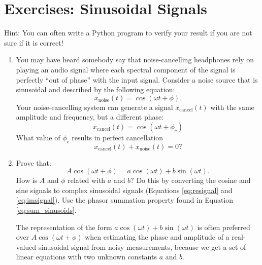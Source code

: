 \newpage
\section{Exercises: Sinusoidal Signals}

Hint: You can often write a Python program to verify your result if you are not sure if it is correct!

\begin{enumerate}

  \item You may have heard somebody say that noise-cancelling headphones
        rely on playing an audio signal where each spectral component of the
        signal is perfectly ``out of phase'' with the input signal. Consider
        a noise source that is sinusoidal and described by the following
        equation:
        \begin{equation}
          x_{\mathrm{noise}}(t) = \cos(\omega t + \phi).
        \end{equation}
        Your noise-cancelling system can generate a signal
        $x_{\mathrm{cancel}}(t)$ with the same amplitude and frequency, but a different phase:
        \begin{equation}
          x_{\mathrm{cancel}}(t) = \cos(\omega t + \phi_c)
        \end{equation}
        What value of $\phi_c$ results in perfect cancellation
        \begin{equation}
          x_{\mathrm{cancel}}(t) + x_{\mathrm{noise}}(t) = 0?
        \end{equation}

  \item Prove that:
        \begin{equation}
          A\cos(\omega t + \phi) = a\cos(\omega t) + b\sin(\omega t).
        \end{equation}
        How is $A$ and $\phi$ related with $a$ and $b$? Do this by converting the cosine and sine signals to complex sinusoidal signals (Equations \ref{eq:resignal} and \ref{eq:imsignal}). Use the phasor summation property found in Equation \ref{eq:sum_sinusoids}.

        The representation of the form $a\cos(\omega t) + b\sin(\omega t)$ is often preferred over $A\cos(\omega t + \phi)$ when estimating the phase and amplitude of a real-valued sinusoidal signal from noisy measurements, because we get a set of linear equations with two unknown constants $a$ and $b$.


\end{enumerate}
